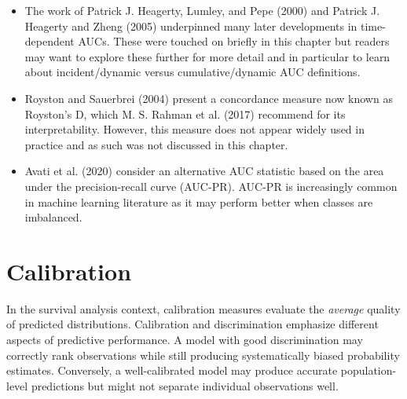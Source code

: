 \documentclass[
  letterpaper,
  krantz2]{style/krantz}
\providecommand{\tightlist}{%
  \setlength{\itemsep}{0pt}\setlength{\parskip}{0pt}}
\begin{document}
\begin{tcolorbox}[enhanced jigsaw, toprule=.15mm, bottomtitle=1mm, opacityback=0, breakable, leftrule=.75mm, title={Further reading}, toptitle=1mm, bottomrule=.15mm, colback=white, colframe=quarto-callout-tip-color-frame, titlerule=0mm, opacitybacktitle=0.6, coltitle=black, rightrule=.15mm, left=2mm, colbacktitle=quarto-callout-tip-color!10!white, arc=.35mm]

\begin{itemize}
\tightlist
\item
  The work of Patrick J. Heagerty, Lumley, and Pepe (2000) and Patrick
  J. Heagerty and Zheng (2005) underpinned many later developments in
  time-dependent AUCs. These were touched on briefly in this chapter but
  readers may want to explore these further for more detail and in
  particular to learn about incident/dynamic versus cumulative/dynamic
  AUC definitions.
\item
  Royston and Sauerbrei (2004) present a concordance measure now known
  as Royston's D, which M. S. Rahman et al. (2017) recommend for its
  interpretability. However, this measure does not appear widely used in
  practice and as such was not discussed in this chapter.
\item
  Avati et al. (2020) consider an alternative AUC statistic based on the
  area under the precision-recall curve (AUC-PR). AUC-PR is increasingly
  common in machine learning literature as it may perform better when
  classes are imbalanced.
\end{itemize}

\end{tcolorbox}

\chapter{Calibration}\label{sec-eval-distr-calib}

In the survival analysis context, calibration
measures evaluate the \emph{average} quality of predicted distributions.
Calibration and discrimination emphasize different
aspects of predictive performance. A model with good discrimination may
correctly rank observations while still producing systematically biased
probability estimates. Conversely, a well-calibrated model may produce
accurate population-level predictions but might not separate individual
observations well.
\end{document}
